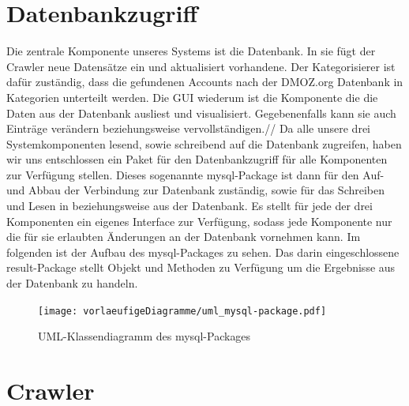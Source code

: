 
\section{Datenbankzugriff}
Die zentrale Komponente unseres Systems ist die Datenbank. In sie fügt der Crawler neue Datensätze ein und aktualisiert vorhandene. Der Kategorisierer ist dafür zuständig, dass die gefundenen Accounts nach der DMOZ.org Datenbank in Kategorien unterteilt werden. Die GUI wiederum ist die Komponente die die Daten aus der Datenbank ausliest und visualisiert. Gegebenenfalls kann sie auch Einträge verändern beziehungsweise vervollständigen.//
Da alle unsere drei Systemkomponenten lesend, sowie schreibend auf die Datenbank zugreifen, haben wir uns entschlossen ein Paket für den Datenbankzugriff für alle Komponenten zur Verfügung stellen. Dieses sogenannte mysql-Package ist dann für den Auf- und Abbau der Verbindung zur Datenbank zuständig, sowie für das Schreiben und Lesen in beziehungsweise aus der Datenbank. Es stellt für jede der drei Komponenten ein eigenes Interface zur Verfügung, sodass jede Komponente nur die für sie erlaubten Änderungen an der Datenbank vornehmen kann.
Im folgenden ist der Aufbau des mysql-Packages zu sehen. Das darin eingeschlossene result-Package stellt Objekt und Methoden zu Verfügung um die Ergebnisse aus der Datenbank zu handeln.

\begin{figure}[p]
\texttt{[image: vorlaeufigeDiagramme/uml\_mysql-package.pdf]}
\caption{UML-Klassendiagramm des mysql-Packages}
\end{figure}

\section{Crawler}

